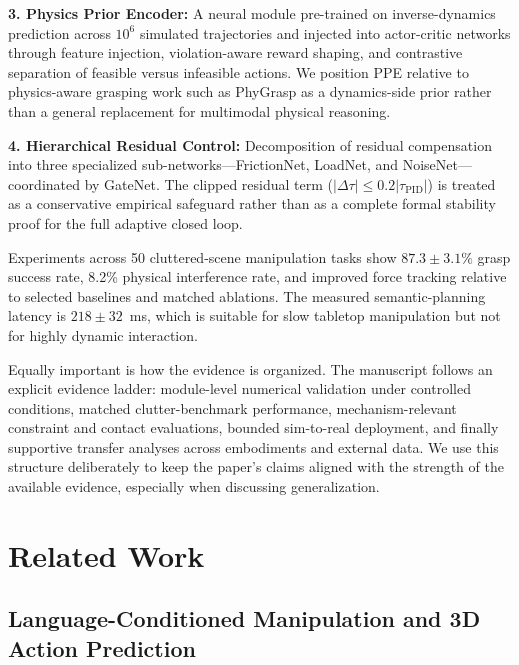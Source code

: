 \documentclass[12pt]{article}
\begin{document}
\textbf{3. Physics Prior Encoder:} A neural module pre-trained on inverse-dynamics prediction across $10^6$ simulated trajectories and injected into actor-critic networks through feature injection, violation-aware reward shaping, and contrastive separation of feasible versus infeasible actions. We position PPE relative to physics-aware grasping work such as PhyGrasp as a dynamics-side prior rather than a general replacement for multimodal physical reasoning.

\textbf{4. Hierarchical Residual Control:} Decomposition of residual compensation into three specialized sub-networks---FrictionNet, LoadNet, and NoiseNet---coordinated by GateNet. The clipped residual term ($|\Delta\tau| \leq 0.2|\tau_{\mathrm{PID}}|$) is treated as a conservative empirical safeguard rather than as a complete formal stability proof for the full adaptive closed loop.

Experiments across 50 cluttered-scene manipulation tasks show $87.3\pm3.1\%$ grasp success rate, 8.2\% physical interference rate, and improved force tracking relative to selected baselines and matched ablations. The measured semantic-planning latency is $218\pm32$~ms, which is suitable for slow tabletop manipulation but not for highly dynamic interaction.

Equally important is how the evidence is organized. The manuscript follows an explicit evidence ladder: module-level numerical validation under controlled conditions, matched clutter-benchmark performance, mechanism-relevant constraint and contact evaluations, bounded sim-to-real deployment, and finally supportive transfer analyses across embodiments and external data. We use this structure deliberately to keep the paper's claims aligned with the strength of the available evidence, especially when discussing generalization.

\section{Related Work}

\subsection{Language-Conditioned Manipulation and 3D Action Prediction}
\end{document}
